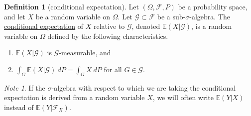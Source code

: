 \documentclass[a4paper,12pt]{scrreprt}
\newcommand{\defn}[1]{\ul{#1}}
\theoremstyle{definition}
\newtheorem{definition}{Definition}[section]
\theoremstyle{plain}
\theoremstyle{remark}
\newtheorem{note}{Note}[section]
\begin{document}
\begin{definition}[conditional expectation]
  \label{def:conditionalexpectation}
  Let $(\Omega, \mathcal{F}, P)$ be a probability space, and let $X$ be a random variable on $\Omega$. Let $\mathcal{G} \subset \mathcal{F}$ be a sub-$\sigma$-algebra. The \defn{conditional expectation} of $X$ relative to $\mathcal{G}$, denoted $\mathbb{E}(X | \mathcal{G})$, is a random variable on $\Omega$ defined by the following characteristics.
  \begin{enumerate}
    \item $\mathbb{E}(X | \mathcal{G})$ is $\mathcal{G}$-measurable, and

    \item $\int_{G} \mathbb{E}(X | \mathcal{G})\ dP = \int_{G} X\ dP$ for all $G \in \mathcal{G}$.
  \end{enumerate}
\end{definition}

\begin{note}
  If the $\sigma$-algebra with respect to which we are taking the conditional expectation is derived from a random variable $X$, we will often write $\mathbb{E}(Y|X)$ instead of $\mathbb{E}(Y|\mathcal{F}_{X})$.
\end{note}
\end{document}
